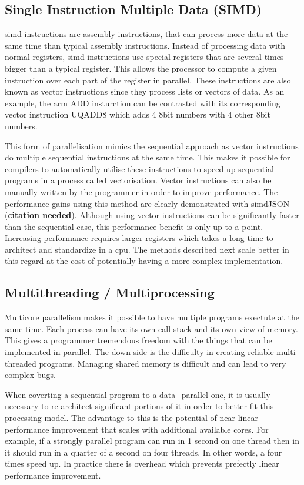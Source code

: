 \subsection{Single Instruction Multiple Data (SIMD)}
\ac{simd} instructions are assembly instructions, that can process more data
at the same time than typical assembly instructions. Instead of processing
data with normal registers, \ac{simd} instructions use special registers that
are several times bigger than a typical register. This allows the processor to
compute a given instruction over each part of the register in parallel. These
instructions are also known as vector instructions since they process lists or
vectors of data. As an example, the arm ADD insturction can be contrasted with
its corresponding vector instruction UQADD8 which adds 4 8bit numbers with 4
other 8bit numbers.

This form of parallelisation mimics the sequential approach as vector
instructions do multiple sequential instructions at the same time. This makes
it possible for compilers to automatically utilise these instructions to speed
up sequential programs in a process called vectorisation. Vector instructions
can also be manually written by the programmer in order to improve performance.
The performance gains using this method are clearly demonstrated with
simdJSON (\textbf{citation needed}). Although using vector instructions can be
significantly faster than the sequential case, this performance benefit is only
up to a point. Increasing performance requires larger registers which takes a
long time to architect and standardize in a \ac{cpu}. The methods described next
scale better in this regard at the cost of potentially having a more complex
implementation.

\subsection{Multithreading / Multiprocessing}
Multicore parallelism makes it possible to have multiple programs exectute at
the same time. Each process can have its own call stack and its own view of
memory. This gives a programmer tremendous freedom with the things that can be
implemented in parallel. The down side is the difficulty in creating reliable
multi-threaded programs. Managing shared memory is difficult and can lead to
very complex bugs.

When coverting a sequential program to a \gls{data_parallel} one, it is usually
necessary to re-architect significant portions of it in order to better fit
this processing model. The advantage to this is the potential of near-linear
performance improvement that scales with additional available cores. For
example, if a strongly parallel program can run in 1 second on one thread then
in it should run in a quarter of a second on four threads. In other words, a
four times speed up. In practice there is overhead which prevents prefectly
linear performance improvement.


